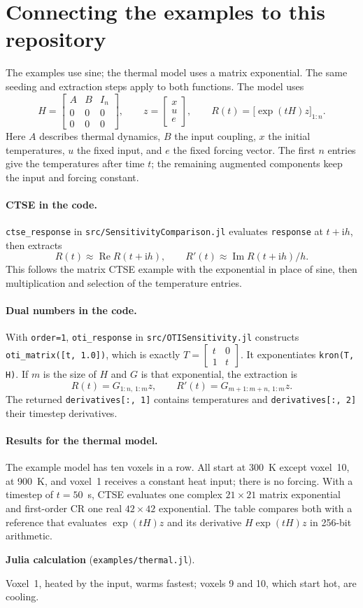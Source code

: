 \documentclass[11pt]{article}
\newcommand{\ii}{\mathrm i}
\newcommand{\juliascript}[1]{\par\medskip\needspace{6\baselineskip}\noindent
  \textbf{Julia calculation} (\nolinkurl{examples/#1}).\par
  }
\begin{document}
\section*{Connecting the examples to this repository}
The examples use sine; the thermal model uses a matrix exponential. The same
seeding and extraction steps apply to both functions. The model uses
\[
 H=\begin{bmatrix}A&B&I_n\\0&0&0\\0&0&0\end{bmatrix},\qquad
 z=\begin{bmatrix}x\\u\\e\end{bmatrix},\qquad
 R(t)=\bigl[\exp(tH)z\bigr]_{1:n}.
\]
Here $A$ describes thermal dynamics, $B$ the input coupling, $x$ the initial
temperatures, $u$ the fixed input, and $e$ the fixed forcing vector.
The first $n$ entries give the temperatures after time $t$; the remaining
augmented components keep the input and forcing constant.

\paragraph{CTSE in the code.}
\texttt{ctse\_response} in \texttt{src/SensitivityComparison.jl} evaluates
\texttt{response} at $t+\ii h$, then extracts
\[
 R(t)\approx\operatorname{Re}R(t+\ii h),\qquad
 R'(t)\approx\operatorname{Im}R(t+\ii h)/h.
\]
This follows the matrix CTSE example with the exponential in place of sine,
then multiplication and selection of the temperature entries.

\paragraph{Dual numbers in the code.}
With \texttt{order=1}, \texttt{oti\_response} in \texttt{src/OTISensitivity.jl}
constructs \texttt{oti\_matrix([t, 1.0])}, which is exactly
$T=\left[\begin{smallmatrix}t&0\\1&t\end{smallmatrix}\right]$.
It exponentiates \texttt{kron(T, H)}. If $m$ is the size of $H$ and $G$ is
that exponential, the extraction is
\[
 R(t)=G_{1:n,\,1:m}z,\qquad
 R'(t)=G_{m+1:m+n,\,1:m}z.
\]
The returned \texttt{derivatives[:, 1]} contains temperatures and
\texttt{derivatives[:, 2]} their timestep derivatives.

\paragraph{Results for the thermal model.}
The example model has ten voxels in a row. All start at 300~K except
voxel~10, at 900~K, and voxel~1 receives a constant heat input; there is no
forcing. With a timestep of $t=50$~s, CTSE evaluates one complex
$21\times21$ matrix exponential and first-order CR one real $42\times42$
exponential. The table compares both with a reference that evaluates
$\exp(tH)z$ and its derivative $H\exp(tH)z$ in 256-bit arithmetic.
\juliascript{thermal.jl}
%
Voxel~1, heated by the input, warms fastest; voxels 9 and 10, which start
hot, are cooling.
\end{document}
